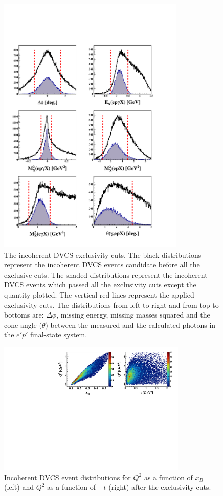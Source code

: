 \documentclass[twocolumn,nofootinbib,showpacs,prl,superscriptaddress,secnumarabic,amssymb,nobibnotes,aps,floatfix]{revtex4}
\begin{document}
\begin{figure}[tb]
\includegraphics[width=8.9cm]{figs/incoh_exc_cuts_final.pdf}
\caption{The incoherent DVCS exclusivity cuts. The black distributions 
   represent the incoherent DVCS events candidate before all the exclusive 
   cuts. The shaded distributions represent the incoherent DVCS events which 
   passed all the exclusivity cuts except the quantity plotted. The vertical 
   red lines represent the applied exclusivity cuts. The distributions from 
   left to right and from top to bottoms are: $\Delta \phi$, missing energy,
   missing masses squared and the cone angle ($\theta$) between the measured 
   and the calculated photons in the $e'p'$ final-state system. }
\label{fig:kin-cuts}

\end{figure}
\begin{figure}[h!]
\hspace{-0.45cm}
\includegraphics[width=9.0cm]{figs/Q2_xB_t_InCoh.pdf}
\caption{Incoherent DVCS event distributions for $Q^{2}$ as a function of 
$x_{B}$ (left) and $Q^{2}$ as a function of $-t$ (right) after the exclusivity 
cuts.}
\label{fig:kin-coverage}
\end{figure}
\end{document}
